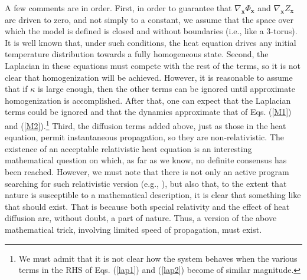 \documentclass[letterpaper,12pt]{article}
\begin{document}
A few comments are in order. First, in order to guarantee that $\nabla_\mathbf{x} \Phi_\mathbf{x} $ and $\nabla_\mathbf{x} Z_\mathbf{x} $ are driven to zero, and not simply to a constant, we assume that the space over which the model is defined is closed and without boundaries (i.e., like a 3-torus). It is well known that, under such conditions, the heat equation drives any initial temperature distribution towards a fully homogeneous state. Second, the Laplacian in these equations must compete with the rest of the terms, so it is not clear that homogenization will be achieved. However, it is reasonable to assume that if $\kappa$ is large enough, then the other terms can be ignored until approximate homogenization is accomplished. After that, one can expect that the Laplacian terms could be ignored and that the dynamics approximate that of Eqs. (\ref{M1}) and (\ref{M2}).\footnote{We must admit that it is not clear how the system behaves when the various terms in the RHS of Eqs. (\ref{lap1}) and (\ref{lap2}) become of similar magnitude.} Third, the diffusion terms added above, just as those in the heat equation, permit instantaneous propagation, so they are non-relativistic. The existence of an acceptable relativistic heat equation is an interesting mathematical question on which, as far as we know, no definite consensus has been reached. However, we must note that there is not only an active program searching for such relativistic version (e.g., \cite{H1,H2,H3,H4,H5}), but also that, to the extent that nature is susceptible to a mathematical description, it is clear that something like that should exist. That is because both special relativity and the effect of heat diffusion are, without doubt, a part of nature. Thus, a version of the above mathematical trick, involving limited speed of propagation, must exist.
\end{document}

